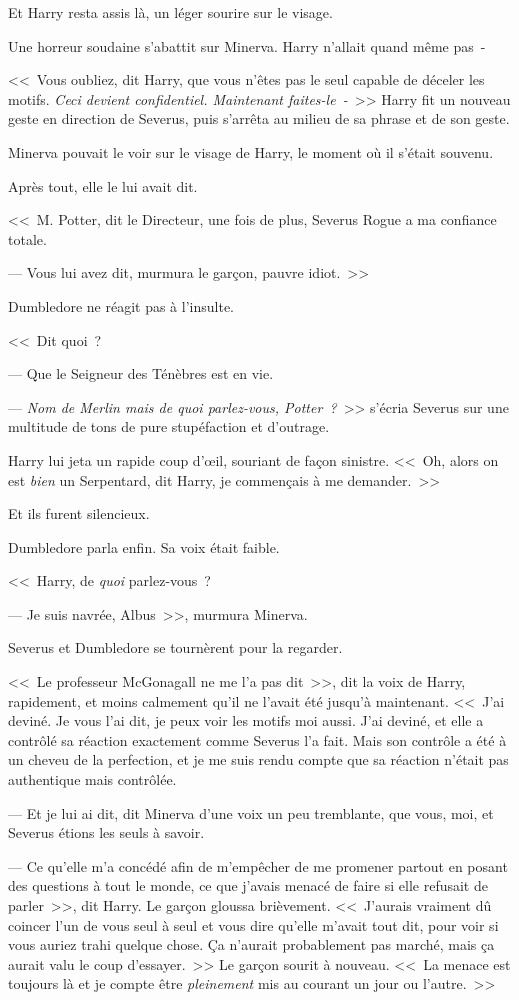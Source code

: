 Et Harry resta assis là, un léger sourire sur le visage.

Une horreur soudaine s'abattit sur Minerva. Harry n'allait quand même pas~-

<<~Vous oubliez, dit Harry, que vous n'êtes pas le seul capable de déceler les motifs. \emph{Ceci devient confidentiel. Maintenant faites-le~-}~>> Harry fit un nouveau geste en direction de Severus, puis s'arrêta au milieu de sa phrase et de son geste.

Minerva pouvait le voir sur le visage de Harry, le moment où il s'était souvenu.

Après tout, elle le lui avait dit.

<<~M. Potter, dit le Directeur, une fois de plus, Severus Rogue a ma confiance totale.

--- Vous lui avez dit, murmura le garçon, pauvre idiot.~>>

Dumbledore ne réagit pas à l'insulte.

<<~Dit quoi~?

--- Que le Seigneur des Ténèbres est en vie.

--- \emph{Nom de Merlin mais de quoi parlez-vous, Potter~?}~>> s'écria Severus sur une multitude de tons de pure stupéfaction et d'outrage.

Harry lui jeta un rapide coup d'œil, souriant de façon sinistre. <<~Oh, alors on est \emph{bien} un Serpentard, dit Harry, je commençais à me demander.~>>

Et ils furent silencieux.

Dumbledore parla enfin. Sa voix était faible.

<<~Harry, de \emph{quoi} parlez-vous~?

--- Je suis navrée, Albus~>>, murmura Minerva.

Severus et Dumbledore se tournèrent pour la regarder.

<<~Le professeur McGonagall ne me l'a pas dit~>>, dit la voix de Harry, rapidement, et moins calmement qu'il ne l'avait été jusqu'à maintenant. <<~J'ai deviné. Je vous l'ai dit, je peux voir les motifs moi aussi. J'ai deviné, et elle a contrôlé sa réaction exactement comme Severus l'a fait. Mais son contrôle a été à un cheveu de la perfection, et je me suis rendu compte que sa réaction n'était pas authentique mais contrôlée.

--- Et je lui ai dit, dit Minerva d'une voix un peu tremblante, que vous, moi, et Severus étions les seuls à savoir.

--- Ce qu'elle m'a concédé afin de m'empêcher de me promener partout en posant des questions à tout le monde, ce que j'avais menacé de faire si elle refusait de parler~>>, dit Harry. Le garçon gloussa brièvement. <<~J'aurais vraiment dû coincer l'un de vous seul à seul et vous dire qu'elle m'avait tout dit, pour voir si vous auriez trahi quelque chose. Ça n'aurait probablement pas marché, mais ça aurait valu le coup d'essayer.~>> Le garçon sourit à nouveau. <<~La menace est toujours là et je compte être \emph{pleinement} mis au courant un jour ou l'autre.~>>

